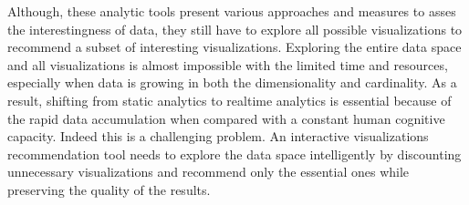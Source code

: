Although, these analytic tools present various approaches and measures to asses the interestingness of data, they still have to explore all possible visualizations to recommend a subset of interesting visualizations.
%
Exploring the entire data space and all visualizations is almost impossible with the limited time and resources, especially when data is growing in both the dimensionality and cardinality.
% 
As a result, shifting from static analytics to realtime analytics is essential because of the rapid data accumulation when compared with a constant human cognitive capacity. 
%
Indeed this is a challenging problem.
%
An interactive visualizations recommendation tool needs to explore the data space intelligently by discounting unnecessary visualizations and recommend only the essential ones while preserving the quality of the results.
%
%
%
%
%
%
%
%
%
%
%
%

